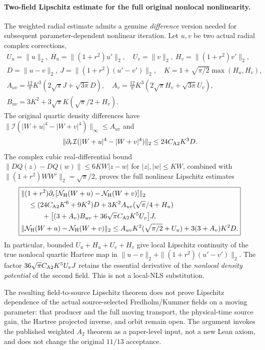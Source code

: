\documentclass[11pt]{amsart}
\begin{document}
\paragraph{Two-field Lipschitz estimate for the full original nonlocal nonlinearity.}
The weighted radial estimate admits a genuine
\emph{difference} version needed for subsequent
parameter-dependent nonlinear iteration.
Let \(u,v\) be two actual radial complex corrections,
\[
 \begin{gathered}
 U_u=\|u\|_2,\ H_u=\|(1+r^2)u'\|_2,\quad
 U_v=\|v\|_2,\ H_v=\|(1+r^2)v'\|_2,\\
 D=\|u-v\|_2,\ J=\|(1+r^2)(u'-v')\|_2,\quad
 K=1+\sqrt{\pi/2}\max(H_u,H_v),\\
 A_{uv}=\frac{12}{\pi}K^3
     (2\sqrt\pi J+\sqrt{3\pi}D),\quad
 A_v=\frac{12}{\pi}K^3
     (2\sqrt\pi H_v+\sqrt{3\pi}U_v),\\
 B_{uv}=3K^2+3\sqrt\pi K(\sqrt\pi/2+H_v).
 \end{gathered}
\]
The original quartic density differences have
\(\|\mathcal I(|W+u|^4-|W+v|^4)\|_\infty
 \le A_{uv}\) and
\[
 \|\partial_r\mathcal I(|W+u|^4-|W+v|^4)\|_2
 \le24C_{\rm A2}K^3D .
\]
The complex cubic real-differential bound
\(\|DQ(z)-DQ(w)\|\le6K W|z-w|\) for
\(|z|,|w|\le KW\), combined with
\(\|(1+r^2)WW'\|_2=\sqrt\pi/2\),
proves the full nonlinear Lipschitz estimates
\[
 \boxed{\begin{aligned}
 &\|(1+r^2)\partial_r[
    \mathcal N_{\rm H}(W+u)-\mathcal N_{\rm H}(W+v)]
     \|_2\\
 &\quad\le(24C_{\rm A2}K^6+9K^2)D
  +3K^2 A_{uv}(\sqrt\pi/4+H_u)\\
 &\qquad\quad+\bigl[(3+A_v)B_{uv}
        +36\sqrt\pi C_{\rm A2}K^5U_v\bigr]J,\\
 &\|\mathcal N_{\rm H}(W+u)-\mathcal N_{\rm H}(W+v)\|_2
 \le A_{uv}K^2(\sqrt{\pi/2}+U_u)
        +3(3+A_v)K^2D .
 \end{aligned}}
\]
In particular, bounded \(U_u+H_u+U_v+H_v\)
give local Lipschitz continuity of the true
nonlocal quartic Hartree map in
\(\|u-v\|_2+\|(1+r^2)(u'-v')\|_2\).
The factor \(36\sqrt\pi C_{\rm A2}K^5U_vJ\)
retains the essential derivative of the
\emph{nonlocal density potential} of the second
field. This is not a local-NLS substitution.

The resulting field-to-source Lipschitz theorem
does not prove Lipschitz dependence of the
actual source-selected Fredholm/Kummer fields
on a moving parameter: that producer and the
full moving transport, the physical-time source
gain, the Hartree projected inverse, and orbit
remain open. The argument invokes the published
weighted \(A_2\) theorem as a paper-level input,
not a new Lean axiom, and does not change the
original \(11/13\) acceptance.
\end{document}
